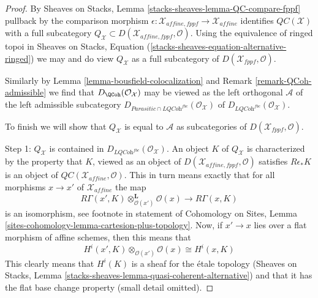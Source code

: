 \begin{proof}
By Sheaves on Stacks, Lemma \ref{stacks-sheaves-lemma-QC-compare-fppf}
pullback by the comparison morphism
$\epsilon : \mathcal{X}_{affine, fppf} \to \mathcal{X}_{affine}$
identifies $\mathit{QC}(\mathcal{X})$ with a full subcategory
$Q_\mathcal{X} \subset D(\mathcal{X}_{affine, fppf}, \mathcal{O})$.
Using the equivalence of ringed topoi in
Sheaves on Stacks, Equation (\ref{stacks-sheaves-equation-alternative-ringed})
we may and do view $Q_\mathcal{X}$ as a full subcategory of
$D(\mathcal{X}_{fppf}, \mathcal{O})$.

\medskip\noindent
Similarly by Lemma \ref{lemma-bousfield-colocalization} and
Remark \ref{remark-QCoh-admissible} we find that
$D_\QCoh(\mathcal{O}_\mathcal{X})$ may be viewed as the
left orthogonal $\mathcal{A}$ of the left admissible subcategory
$D_{\textit{Parasitic} \cap \textit{LQCoh}^{fbc}}(\mathcal{O}_\mathcal{X})$
of $D_{\textit{LQCoh}^{fbc}}(\mathcal{O}_\mathcal{X})$.

\medskip\noindent
To finish we will show that $Q_\mathcal{X}$ is equal to
$\mathcal{A}$ as subcategories of $D(\mathcal{X}_{fppf}, \mathcal{O})$.

\medskip\noindent
Step 1: $Q_\mathcal{X}$ is contained in
$D_{\textit{LQCoh}^{fbc}}(\mathcal{O}_\mathcal{X})$.
An object $K$ of $Q_\mathcal{X}$ is characterized by the property
that $K$, viewed as an object of $D(\mathcal{X}_{affine, fppf}, \mathcal{O})$
satisfies $R\epsilon_*K$ is an object of
$\mathit{QC}(\mathcal{X}_{affine}, \mathcal{O})$.
This in turn means exactly that for all morphisms $x \to x'$
of $\mathcal{X}_{affine}$ the map
$$
R\Gamma(x', K) \otimes_{\mathcal{O}(x')}^\mathbf{L} \mathcal{O}(x)
\longrightarrow
R\Gamma(x, K)
$$
is an isomorphism, see footnote in statement of Cohomology on Sites,
Lemma \ref{sites-cohomology-lemma-cartesion-plus-topology}.
Now, if $x' \to x$ lies over a flat morphism of affine schemes,
then this means that
$$
H^i(x', K) \otimes_{\mathcal{O}(x')} \mathcal{O}(x)
\cong
H^i(x, K)
$$
This clearly means that $H^i(K)$ is a sheaf for the \'etale topology
(Sheaves on Stacks, Lemma \ref{stacks-sheaves-lemma-quasi-coherent-alternative})
and that it has the flat base change property (small detail omitted).


\end{proof}

